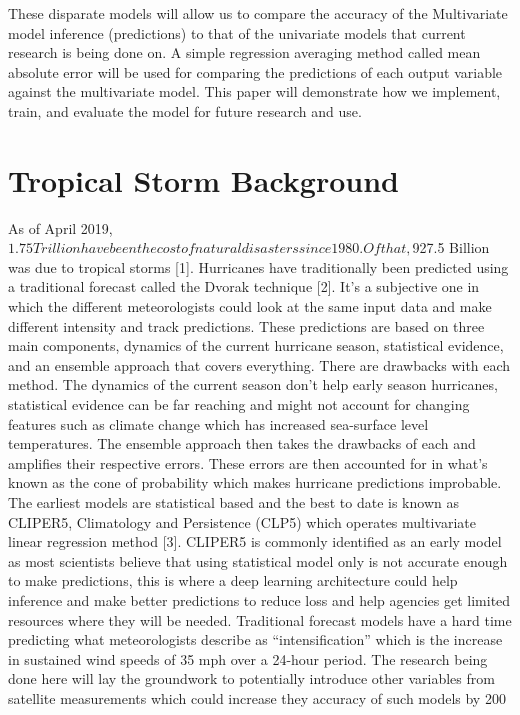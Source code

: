 \documentclass{article}
\begin{document}
These disparate models will allow us to compare the accuracy of the Multivariate model inference (predictions) to that of the univariate models that current research is being done on. A simple regression averaging method called mean absolute error will be used for comparing the predictions of each output variable against the multivariate model. This paper will demonstrate how we implement, train, and evaluate the model for future research and use.

\section{Tropical Storm Background}
As of April 2019, $1.75 Trillion have been the cost of natural disasters since 1980. Of that, $927.5 Billion was due to tropical storms [1]. Hurricanes have traditionally been predicted using a traditional forecast called the Dvorak technique [2]. It’s a subjective one in which the different meteorologists could look at the same input data and make different intensity and track predictions. These predictions are based on three main components, dynamics of the current hurricane season, statistical evidence, and an ensemble approach that covers everything. There are drawbacks with each method. The dynamics of the current season don’t help early season hurricanes, statistical evidence can be far reaching and might not account for changing features such as climate change which has increased sea-surface level temperatures. The ensemble approach then takes the drawbacks of each and amplifies their respective errors. These errors are then accounted for in what’s known as the cone of probability which makes hurricane predictions improbable. The earliest models are statistical based and the best to date is known as CLIPER5, Climatology and Persistence (CLP5) which operates multivariate linear regression method [3]. CLIPER5 is commonly identified as an early model as most scientists believe that using statistical model only is not accurate enough to make predictions, this is where a deep learning architecture could help inference and make better predictions to reduce loss and help agencies get limited resources where they will be needed. Traditional forecast models have a hard time predicting what meteorologists describe as “intensification” which is the increase in sustained wind speeds of 35 mph over a 24-hour period. The research being done here will lay the groundwork to potentially introduce other variables from satellite measurements which could increase they accuracy of such models by 200%
\end{document}
